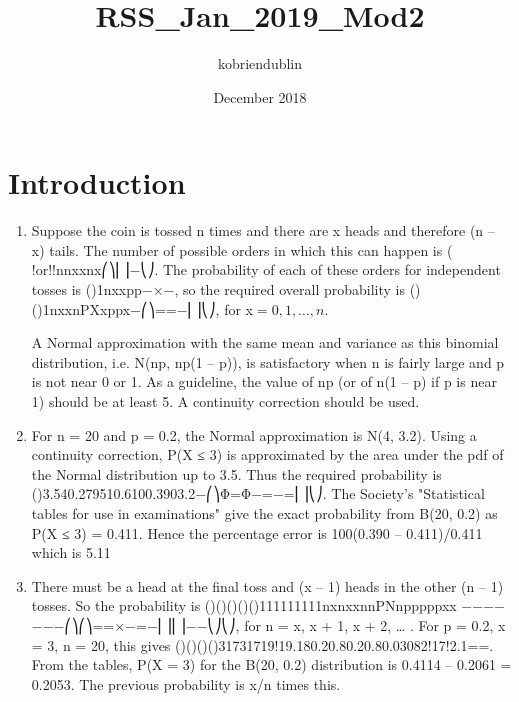 \documentclass{article}
\title{RSS_Jan_2019_Mod2}
\author{kobriendublin }
\date{December 2018}
\begin{document}
\section{Introduction}

\begin{enumerate}
    \item 

 Suppose the coin is tossed n times and there are x heads and therefore (n – x) tails. The number of possible orders in which this can happen is ( !or!!nnxxnx⎛⎞⎜⎟−⎝⎠. The probability of each of these orders for independent tosses is ()1nxxpp−×−, so the required overall probability is ()()1nxxnPXxppx−⎛⎞==−⎜⎟⎝⎠, for x$ = 0, 1, …, n$.

A Normal approximation with the same mean and variance as this binomial distribution, i.e. N(np, np(1 – p)), is satisfactory when n is fairly large and p is not near 0 or 1. As a guideline, the value of np (or of n(1 – p) if p is near 1) should be at least 5. A continuity correction should be used.
\item For n = 20 and p = 0.2, the Normal approximation is N(4, 3.2). Using a continuity correction, P(X ≤ 3) is approximated by the area under the pdf of the Normal distribution up to 3.5. Thus the required probability is
()3.540.279510.6100.3903.2−⎛⎞Φ=Φ−=−=⎜⎟⎝⎠.
The Society's "Statistical tables for use in examinations" give the exact probability from B(20, 0.2) as P(X ≤ 3) = 0.411. Hence the percentage error is 100(0.390 – 0.411)/0.411 which is 5.11%
\item There must be a head at the final toss and (x – 1) heads in the other (n – 1) tosses. So the probability is
()()()()()111111111nxnxxnnPNnpppppxx −−−−−−−⎛⎞⎛⎞==×−=−⎜⎟⎜⎟−−⎝⎠⎝⎠,
for n = x, x + 1, x + 2, … . For p = 0.2, x = 3, n = 20, this gives
()()()()31731719!19.180.20.80.20.80.03082!17!2.1==.
From the tables, P(X = 3) for the B(20, 0.2) distribution is 0.4114 – 0.2061 = 0.2053. The previous probability is x/n times this.
\end{enumerate}
\end{document}
